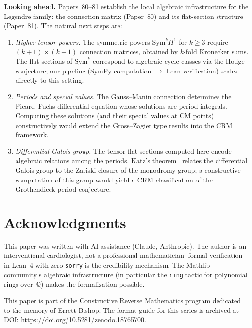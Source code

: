 \documentclass[11pt]{article}
\theoremstyle{plain}
\theoremstyle{definition}
\theoremstyle{remark}
\newcommand{\Q}{\mathbb{Q}}
\newcommand{\Sym}{\mathrm{Sym}}
\begin{document}
\medskip\noindent
\textbf{Looking ahead.}
Papers~80--81 establish the local algebraic infrastructure
for the Legendre family: the connection matrix (Paper~80)
and its flat-section structure (Paper~81).  The natural
next steps are:
\begin{enumerate}[nosep]
\item \emph{Higher tensor powers.}
  The symmetric powers $\Sym^k H^1$ for $k \geq 3$ require
  $(k+1) \times (k+1)$ connection matrices, obtained
  by $k$-fold Kronecker sums.  The flat sections
  of $\Sym^k$ correspond to algebraic cycle classes
  via the Hodge conjecture; our pipeline
  (SymPy computation $\to$ Lean verification) scales
  directly to this setting.
\item \emph{Periods and special values.}
  The Gauss--Manin connection determines the Picard--Fuchs
  differential equation whose solutions are period
  integrals.  Computing these solutions (and their
  special values at CM points) constructively would
  extend the Gross--Zagier type results into the
  CRM framework.
\item \emph{Differential Galois group.}
  The tensor flat sections computed here encode
  algebraic relations among the periods.  Katz's
  theorem~\cite{Katz1972} relates the differential
  Galois group to the Zariski closure of the monodromy
  group; a constructive computation of this group
  would yield a CRM classification of the
  Grothendieck period conjecture.
\end{enumerate}

\section*{Acknowledgments}

This paper was written with AI assistance (Claude, Anthropic).
The author is an interventional cardiologist, not a professional
mathematician; formal verification in Lean~4 with zero
\texttt{sorry} is the credibility mechanism.  The Mathlib
community's algebraic infrastructure (in particular the
\texttt{ring} tactic for polynomial rings over~$\Q$) makes
the formalization possible.

This paper is part of the Constructive Reverse Mathematics
program dedicated to the memory of Errett Bishop.
The format guide for this series is archived at
DOI: \url{https://doi.org/10.5281/zenodo.18765700}.
\end{document}
